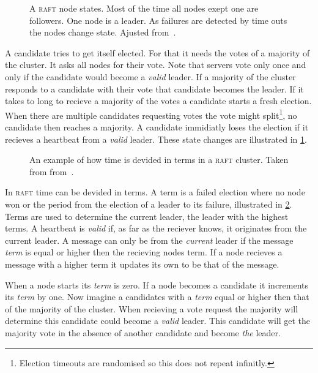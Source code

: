 \begin{figure}[htbp]
	\centering
	
	\caption{A \textsc{raft} node states. Most of the time all nodes exept one are followers. One node is a leader. As failures are detected by time outs the nodes change state. Ajusted from~\cite{raft}.}
	\label{fig:raft_states}
\end{figure}
%
A candidate tries to get itself elected. For that it needs the votes of a majority of the cluster. It asks all nodes for their vote. Note that servers vote only once and only if the candidate would become a \emph{valid} leader. If a majority of the cluster responds to a candidate with their vote that candidate becomes the leader. If it takes to long to recieve a majority of the votes a candidate starts a fresh election. When there are multiple candidates requesting votes the vote might split\footnote{Election timeouts are randomised so this does not repeat infinitly.}, no candidate then reaches a majority. A candidate immidiatly loses the election if it recieves a heartbeat from a \emph{valid} leader. These state changes are illustrated in \cref{fig:raft_states}.

\begin{figure}[htbp]
	\centering
	
	\caption{An example of how time is devided in terms in a \textsc{raft} cluster. Taken from from~\cite{raft}.}
	\label{fig:raft_terms}
\end{figure}

In \textsc{raft} time can be devided in terms. A term is a failed election where no node won or the period from the election of a leader to its failure, illustrated in \cref{fig:raft_terms}. Terms are used to determine the current leader, the leader with the highest terms. A heartbeat is \emph{valid} if, as far as the reciever knows, it originates from the current leader. A message can only be from the \textit{current} leader if the message \textit{term} is equal or higher then the recieving nodes term. If a node recieves a message with a higher term it updates its own to be that of the message.

When a node starts its \textit{term} is zero. If a node becomes a candidate it increments its \textit{term} by one. Now imagine a candidates with a \textit{term} equal or higher then that of the majority of the cluster. When recieving a vote request the majority will determine this candidate could become a \emph{valid} leader. This candidate will get the majority vote in the absence of another candidate and become \textit{the} leader.

